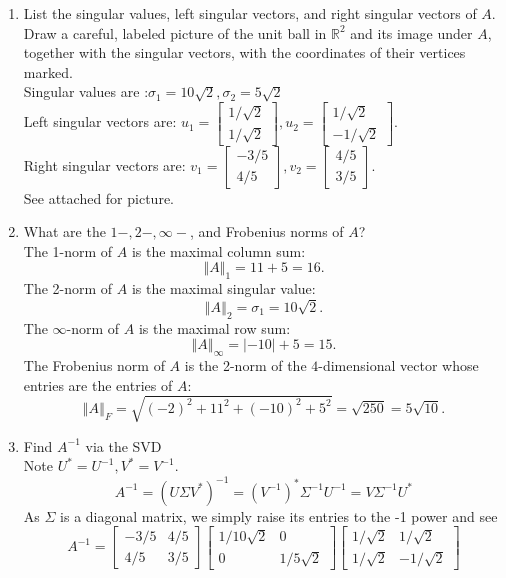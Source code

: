 \documentclass[12pt]{article}
\numberwithin{equation}{section}
\newcommand{\norm}[1]{\left\Vert#1\right\Vert}
\begin{document}
\begin{enumerate}
\begin{enumerate}
    \item List the singular values, left singular vectors, and right singular vectors of $A$. Draw a careful, labeled picture of the unit ball in $\mathbb{R}^2$ and its image under $A$, together with the singular vectors, with the coordinates of their vertices marked.\\
        Singular values are :$\sigma_1=10\sqrt{2},\sigma_2=5\sqrt{2}$\\
        Left singular vectors are: $u_1=\left[\begin{array}{c}1/\sqrt{2}\\1/\sqrt{2}\end{array}\right],u_2=\left[\begin{array}{c}1/\sqrt{2}\\-1/\sqrt{2}\end{array}\right]$.\\
        Right singular vectors are: $v_1=\left[\begin{array}{c}-3/5\\4/5\end{array}\right],v_2=\left[\begin{array}{c}4/5\\3/5\end{array}\right].$\\
        See attached for picture.
    \item What are the $1-,2-,\infty-$, and Frobenius norms of $A$?\\
        The 1-norm of $A$ is the maximal column sum:
        $$\norm{A}_1=11+5=16.$$
        The 2-norm of $A$ is the maximal singular value:
        $$\norm{A}_2=\sigma_1=10\sqrt{2}.$$
        The $\infty$-norm of $A$ is the maximal row sum:
        $$\norm{A}_\infty=|-10|+5=15.$$
        The Frobenius norm of $A$ is the 2-norm of the $4$-dimensional vector whose entries are the entries of $A$:
        $$\norm{A}_F=\sqrt{(-2)^2+11^2+(-10)^2+5^2}=\sqrt{250}=5\sqrt{10}.$$
    \item Find $A^{-1}$ via the SVD\\
        Note $U^*=U^{-1},V^*=V^{-1}$.
        $$A^{-1}=(U\Sigma V^*)^{-1}=(V^{-1})^*\Sigma^{-1}U^{-1}=V\Sigma^{-1}U^*$$
        As $\Sigma$ is a diagonal matrix, we simply raise its entries to the -1 power and see
        $$A^{-1}=\left[\begin{array}{cc}-3/5&4/5\\4/5&3/5\end{array}\right]\left[\begin{array}{cc}1/10\sqrt{2}&0\\0&1/5\sqrt{2}\end{array}\right]\left[\begin{array}{cc}1/\sqrt{2}&1/\sqrt{2}\\1/\sqrt{2}&-1/\sqrt{2}\end{array}\right]
$$
\end{enumerate}
\end{enumerate}
\end{document}
